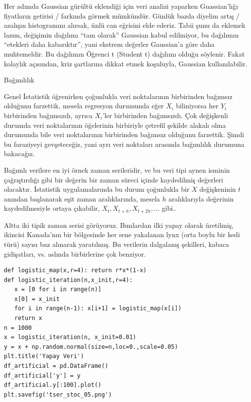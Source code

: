 \documentclass[12pt,fleqn]{article}\usepackage{../../common}
\begin{document}
Her adımda Gaussian gürültü eklendiği için veri analizi yaparken Guassian'lığı
fiyatların getirisi / farkında görmek mümkündür. Günlük bazda diyelim artış /
azalışın histogramını alırsak, ünlü can eğrisini elde ederiz. Tabii şunu da
eklemek lazım, değişimin dağılımı ``tam olarak'' Gaussian kabul edilmiyor, bu
dağılımın ``etekleri daha kabarıktır'', yani ekstrem değerler Gaussian'a göre
daha muhtemeldir. Bu dağılımın Öğrenci t (Student t) dağılımı olduğu
söylenir. Fakat kolaylık açısından, kriz şartlarına dikkat etmek koşuluyla,
Gaussian kullanılabilir.

Bağımlılık

Genel İstatistik öğrenirken çoğunlukla veri noktalarının birbirinden bağımsız
olduğunu farzettik, mesela regresyon durumunda eğer $X_i$ biliniyorsa her $Y_i$
birbirinden bağımsızdı, ayrıca $X_i$'ler birbirinden bağımsızdı. Çok değişkenli
durumda veri noktalarının öğelerinin birbiriyle çetrefil şekilde alakalı olma
durumunda bile veri noktalarının birbirinden bağımsız olduğunu farzettik. Şimdi
bu faraziyeyi gevşeteceğiz, yani ayrı veri noktaları arasında bağımlılık
durumuna bakacağız.

Bağımlı verilere en iyi örnek zaman serileridir, ve bu veri tipi aynen isminin
çağrıştırdığı gibi bir değerin bir zaman süreci içinde kaydedilmiş değerleri
olacaktır. İstatistik uygulamalarında bu durum çoğunlukla bir $X$ değişkeninin
$t$ anından başlanarak eşit zaman aralıklarında, mesela $h$ aralıklarıyla
değerinin kaydedilmesiyle ortaya çıkabilir, $X_t,X_{t+h},X_{t+2h},...$ gibi..

Altta iki tipik zaman serisi görüyoruz. Bunlardan ilki yapay olarak üretilmiş,
ikincisi Kanada'nın bir bölgesinde her sene yakalanan lynx (orta boylu bir kedi
türü) sayısı baz alınarak yaratılmış. Bu verilerin dalgalanış şekilleri, kabaca
gidişatları, vs. aslında birbirlerine çok benziyor.

\begin{verbatim}
def logistic_map(x,r=4): return r*x*(1-x) 
def logistic_iteration(n,x_init,r=4):
   x = [0 for i in range(n)]
   x[0] = x_init
   for i in range(n-1): x[i+1] = logistic_map(x[i])
   return x
n = 1000
x = logistic_iteration(n, x_init=0.01)
y = x + np.random.normal(size=n,loc=0.,scale=0.05)
plt.title('Yapay Veri')
df_artificial = pd.DataFrame()
df_artificial['y'] = y
df_artificial.y[:100].plot()
plt.savefig('tser_stoc_05.png')
\end{verbatim}
\end{document}
